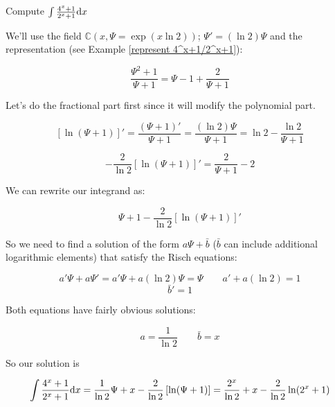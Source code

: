 \example Compute $\int {{4^x+1}\over{2^x+1}} {\rm d}x$
\label{integrate 4^x+1/2^x+1}

We'll use the field ${\mathbb C}(x,\Psi = \exp(x \ln 2))$; $\Psi' =
(\ln 2)\Psi$ and the representation (see Example
\ref{represent 4^x+1/2^x+1}):

$$ \frac{\Psi^2+1}{\Psi+1} = \Psi-1+\frac{2}{\Psi+1}$$

Let's do the fractional part first since it will modify the polynomial
part.

$$\left[\ln(\Psi+1)\right]' = \frac{(\Psi + 1)'}{\Psi+1} = \frac{(\ln
2)\Psi}{\Psi + 1} = \ln 2 - \frac{\ln 2}{\Psi+1}$$

$$-\frac{2}{\ln 2}\left[\ln(\Psi+1)\right]' = \frac{2}{\Psi+1} - 2$$

We can rewrite our integrand as:

$$ \Psi + 1 - \frac{2}{\ln 2}\left[\ln(\Psi+1)\right]'$$

So we need to find a solution of the form $a\Psi + \bar{b}$ ($\bar{b}$
can include additional logarithmic elements) that satisfy the Risch
equations:

$$a'\Psi + a\Psi' = a'\Psi + a(\ln 2)\Psi = \Psi \qquad a' + a(\ln 2) = 1$$
$$\bar{b}' = 1$$

Both equations have fairly obvious solutions:

$$a = \frac{1}{\ln 2} \qquad \bar{b}=x$$

So our solution is

$$\int {{4^x+1}\over{2^x+1}} {\rm d}x = \frac{1}{\ln 2}\Psi + x  - \frac{2}{\ln 2}\left[\ln(\Psi+1)\right] =
\frac{2^x}{\ln 2} + x - \frac{2}{\ln 2}\ln(2^x+1) $$

\endexample


